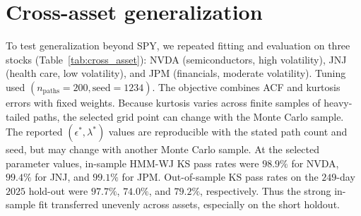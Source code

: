 
\section{Cross-asset generalization}
\label{sec:supp-cross-asset}

To test generalization beyond SPY, we repeated fitting and evaluation
on three stocks (Table~\ref{tab:cross_asset}): NVDA
(semiconductors, high volatility), JNJ (health care, low
volatility), and JPM (financials, moderate volatility). Tuning used $(n_{\mathrm{paths}} = 200, \mathrm{seed} = 1234)$.
The objective combines
ACF and kurtosis errors with fixed weights. Because kurtosis varies
across finite samples of heavy-tailed paths, the selected grid point
can change with the Monte Carlo sample. The reported
$(\epsilon^{*},\lambda^{*})$ values are reproducible with the stated
path count and seed, but may change with another Monte Carlo sample. At the
selected parameter values, in-sample HMM-WJ KS pass rates were
$98.9\%$ for NVDA, $99.4\%$ for JNJ, and $99.1\%$ for JPM.
Out-of-sample KS pass rates on the $249$-day $2025$ hold-out were
$97.7\%$, $74.0\%$, and $79.2\%$, respectively. Thus the strong
in-sample fit transferred unevenly across assets, especially on the
short holdout.

